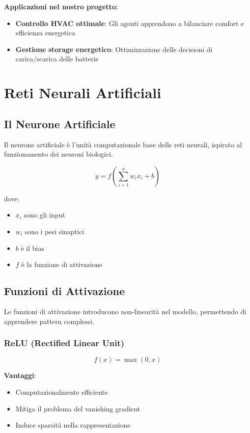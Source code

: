 \documentclass[12pt,a4paper,twoside]{report}
\begin{document}
\textbf{Applicazioni nel nostro progetto:}
\begin{itemize}
    \item \textbf{Controllo HVAC ottimale}: Gli agenti apprendono a bilanciare comfort e efficienza energetica
    \item \textbf{Gestione storage energetico}: Ottimizzazione delle decisioni di carica/scarica delle batterie
\end{itemize}

\section{Reti Neurali Artificiali}

\subsection{Il Neurone Artificiale}

Il neurone artificiale è l'unità computazionale base delle reti neurali, ispirato al funzionamento dei neuroni biologici.

\begin{equation}
y = f\left(\sum_{i=1}^{n} w_i x_i + b\right)
\end{equation}

dove:
\begin{itemize}
    \item $x_i$ sono gli input
    \item $w_i$ sono i pesi sinaptici
    \item $b$ è il bias
    \item $f$ è la funzione di attivazione
\end{itemize}

\subsection{Funzioni di Attivazione}

Le funzioni di attivazione introducono non-linearità nel modello, permettendo di apprendere pattern complessi.

\subsubsection{ReLU (Rectified Linear Unit)}
\begin{equation}
f(x) = \max(0, x)
\end{equation}

\textbf{Vantaggi}:
\begin{itemize}
    \item Computazionalmente efficiente
    \item Mitiga il problema del vanishing gradient
    \item Induce sparsità nella rappresentazione
\end{itemize}
\end{document}
